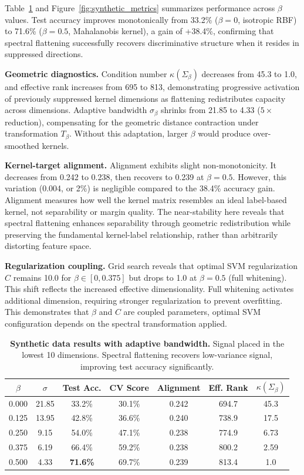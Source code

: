 \documentclass{article}
\begin{document}
Table~\ref{tab:synthetic_results} and Figure~\ref{fig:synthetic_metrics} summarizes performance across $\beta$ values. Test accuracy improves monotonically from 33.2\% ($\beta=0$, isotropic RBF) to 71.6\% ($\beta=0.5$, Mahalanobis kernel), a gain of +38.4\%, confirming that spectral flattening successfully recovers discriminative structure when it resides in suppressed directions.

\textbf{Geometric diagnostics.} Condition number $\kappa(\Sigma_\beta)$ decreases from 45.3 to 1.0, and effective rank increases from 695 to 813, demonstrating progressive activation of previously suppressed kernel dimensions as flattening redistributes capacity across dimensions. Adaptive bandwidth $\sigma_\beta$ shrinks from 21.85 to 4.33 ($5\times$ reduction), compensating for the geometric distance contraction under transformation $T_\beta$. Without this adaptation, larger $\beta$ would produce over-smoothed kernels.

\textbf{Kernel-target alignment.} Alignment exhibits slight non-monotonicity. It decreases from 0.242 to 0.238, then recovers to 0.239 at $\beta=0.5$. However, this variation (0.004, or 2\%) is negligible compared to the 38.4\% accuracy gain. Alignment measures how well the kernel matrix resembles an ideal label-based kernel, not separability or margin quality. The near-stability here reveals that spectral flattening enhances separability through geometric redistribution while preserving the fundamental kernel-label relationship, rather than arbitrarily distorting feature space.

\textbf{Regularization coupling.} Grid search reveals that optimal SVM regularization $C$ remains 10.0 for $\beta \in [0, 0.375]$ but drops to 1.0 at $\beta=0.5$ (full whitening). This shift reflects the increased effective dimensionality. Full whitening activates additional dimension, requiring stronger regularization to prevent overfitting. This demonstrates that $\beta$ and $C$ are coupled parameters, optimal SVM configuration depends on the spectral transformation applied.

\begin{table}[h]
\centering
\caption{\textbf{Synthetic data results with adaptive bandwidth.} Signal placed in the lowest 10 dimensions. Spectral flattening recovers low-variance signal, improving test accuracy significantly.}
\label{tab:synthetic_results}
\begin{tabular}{ccccccc}
\toprule
$\beta$ & $\sigma$ & Test Acc. & CV Score & Alignment & Eff. Rank & $\kappa(\Sigma_\beta)$ \\
\midrule
0.000 & 21.85 & 33.2\% & 30.1\% & 0.242 & 694.7 & 45.3 \\
0.125 & 13.95 & 42.8\% & 36.6\% & 0.240 & 738.9 & 17.5 \\
0.250 & 9.15  & 54.0\% & 47.1\% & 0.238 & 774.9 & 6.73 \\
0.375 & 6.19  & 66.4\% & 59.2\% & 0.238 & 800.2 & 2.59 \\
0.500 & 4.33  & \textbf{71.6\%} & 69.7\% & 0.239 & 813.4 & 1.0 \\
\bottomrule
\end{tabular}
\end{table}
\end{document}
